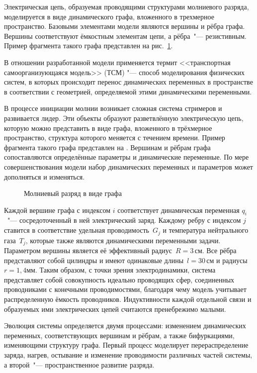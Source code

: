 Электрическая цепь, образуемая проводящими структурами молниевого разряда, моделируется в виде динамического графа, вложенного в трехмерное пространство. Базовыми элементами модели являются вершины и рёбра графа. Вершины соответствуют ёмкостным элементам цепи, а рёбра~"--- резистивным. Пример фрагмента такого графа представлен на рис.~\ref{fig:net-frag}. 

В отношении разработанной модели применяется термит <<транспортная самоорганизующаяся модель>> (ТСМ) "--- способ моделирования физических систем, в которых происходит перенос динамических переменных в пространстве в соответствии с геометрией, определяемой этими динамическими переменными.

В процессе инициации молнии возникает сложная система стримеров и развивается лидер. 
Эти объекты образуют разветвлённую электрическую цепь, которую можно представить в виде графа, вложенного в трёхмерное пространство, структура которого меняется с течением времени. Пример фрагмента такого графа представлен на . Вершинам и рёбрам графа сопоставляются определённые параметры и динамические переменные. По мере совершенствования модели набор динамических переменных и параметров может дополняться и изменяться.

\begin{figure}[h]
	\caption{Молниевый разряд в виде графа}
	\label{fig:net-frag}
\end{figure}

Каждой вершине графа с индексом $i$ соответствует динамическая переменная $q_i$~"--- сосредоточенный в ней электрический заряд. Каждому ребру с индексом $j$ ставится в соответствие удельная проводимость~$G_j$ и температура нейтрального газа~$T_j$, которые также являются динамическими переменными задачи. Параметром вершины является её эффективный радиус~$R=3\,\text{см}$. Все рёбра представляют собой цилиндры и имеют одинаковые длины~$l=30\,\text{см}$ и радиусы $r=1,4\text{мм}$. Таким образом, с точки зрения электродинамики, система представляет собой совокупность идеально проводящих сфер, соединенных проводниками с конечными проводимостями, благодаря чему модель учитывает распределенную ёмкость проводников. Индуктивности каждой отдельной связи и образуемых ими электрических цепей считаются пренебрежимо малыми.

Эволюция системы определяется двумя процессами: изменением динамических переменных, соответствующих вершинам и рёбрам, а также бифуркациями, изменяющими структуру графа. Первый процесс моделирует перераспределение заряда, нагрев, остывание и изменение проводимости различных частей системы, а второй~"--- пространственное развитие разряда.

